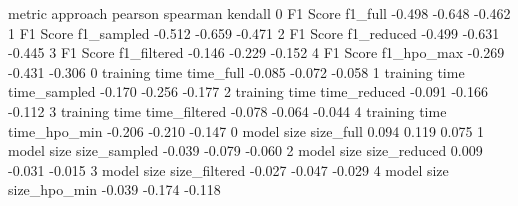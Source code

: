           metric       approach pearson spearman kendall
0       F1 Score        f1_full  -0.498   -0.648  -0.462
1       F1 Score     f1_sampled  -0.512   -0.659  -0.471
2       F1 Score     f1_reduced  -0.499   -0.631  -0.445
3       F1 Score    f1_filtered  -0.146   -0.229  -0.152
4       F1 Score     f1_hpo_max  -0.269   -0.431  -0.306
0  training time      time_full  -0.085   -0.072  -0.058
1  training time   time_sampled  -0.170   -0.256  -0.177
2  training time   time_reduced  -0.091   -0.166  -0.112
3  training time  time_filtered  -0.078   -0.064  -0.044
4  training time   time_hpo_min  -0.206   -0.210  -0.147
0     model size      size_full   0.094    0.119   0.075
1     model size   size_sampled  -0.039   -0.079  -0.060
2     model size   size_reduced   0.009   -0.031  -0.015
3     model size  size_filtered  -0.027   -0.047  -0.029
4     model size   size_hpo_min  -0.039   -0.174  -0.118